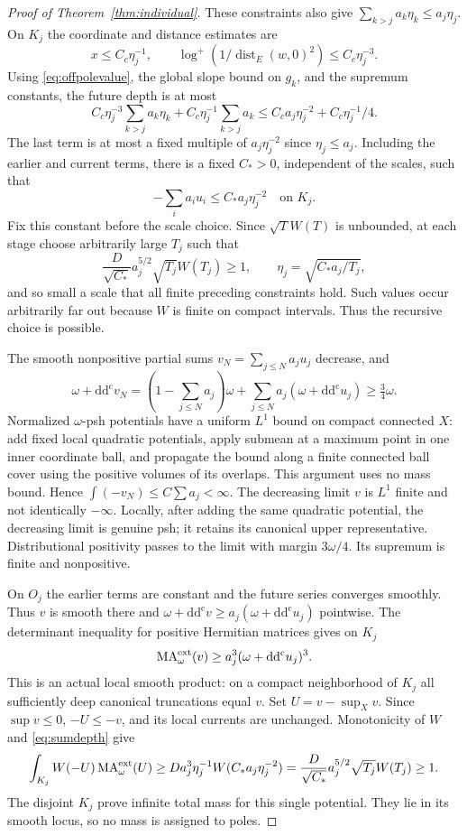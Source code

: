 \documentclass[11pt]{article}
\theoremstyle{remark}
\newcommand{\ddc}{\mathrm{d}\mathrm{d}^{\mathrm c}}
\newcommand{\MA}{\operatorname{MA}}
\begin{document}
\begin{proof}[Proof of Theorem~\ref{thm:individual}]
These constraints also give $\sum_{k>j}a_k\eta_k\leq a_j\eta_j$.
On $K_j$ the coordinate and distance estimates are
\[
 x\leq C_c\eta_j^{-1},\qquad
 \log^+(1/\operatorname{dist}_E(w,0)^2)\leq C_c\eta_j^{-3}.
\]
Using \eqref{eq:offpolevalue}, the global slope bound on $g_k$, and the
supremum constants, the future depth is at most
\[
 C_c\eta_j^{-3}\sum_{k>j}a_k\eta_k
       +C_c\eta_j^{-1}\sum_{k>j}a_k
 \leq C_c a_j\eta_j^{-2}+C_c\eta_j^{-1}/4.
\]
The last term is at most a fixed multiple of $a_j\eta_j^{-2}$ since
$\eta_j\leq a_j$. Including the earlier and current terms, there is a fixed
$C_*>0$, independent of the scales, such that
\begin{equation}\label{eq:sumdepth}
 -\sum_i a_iu_i\leq C_*a_j\eta_j^{-2}\quad\text{on }K_j.
\end{equation}
Fix this constant before the scale choice. Since $\sqrt T W(T)$ is unbounded,
at each stage choose arbitrarily large $T_j$ such that
\[
 \frac D{\sqrt{C_*}}a_j^{5/2}\sqrt{T_j}W(T_j)\geq1,
 \qquad \eta_j=\sqrt{C_*a_j/T_j},
\]
and so small a scale that all finite preceding constraints hold.
Such values occur arbitrarily far out because $W$ is finite on compact
intervals. Thus the recursive choice is possible.

The smooth nonpositive partial sums $v_N=\sum_{j\leq N}a_ju_j$ decrease, and
\[
 \omega+\ddc v_N
 =(1-\sum_{j\leq N}a_j)\omega
       +\sum_{j\leq N}a_j(\omega+\ddc u_j)\geq\tfrac34\omega.
\]
Normalized $\omega$-psh potentials have a uniform $L^1$ bound on compact
connected $X$: add fixed local quadratic potentials, apply submean at a
maximum point in one inner coordinate ball, and propagate the bound along
a finite connected ball cover using the positive volumes of its overlaps.
This argument uses no mass bound. Hence $\int(-v_N)\leq C\sum a_j<\infty$.
The decreasing limit $v$ is $L^1$ finite and not identically $-\infty$.
Locally, after adding the same quadratic potential, the decreasing limit is
genuine psh; it retains its canonical upper representative.
Distributional positivity passes to the limit with margin $3\omega/4$.
Its supremum is finite and nonpositive.

On $O_j$ the earlier terms are constant and the future series converges
smoothly. Thus $v$ is smooth there and
$\omega+\ddc v\geq a_j(\omega+\ddc u_j)$ pointwise.
The determinant inequality for positive Hermitian matrices gives on $K_j$
\[
 \MA^{\rm ext}_\omega(v)\geq a_j^3(\omega+\ddc u_j)^3.
\]
This is an actual local smooth product: on a compact neighborhood of $K_j$
all sufficiently deep canonical truncations equal $v$.
Set $U=v-\sup_Xv$. Since $\sup v\leq0$, $-U\leq-v$, and its local currents
are unchanged. Monotonicity of $W$ and \eqref{eq:sumdepth} give
\[
 \int_{K_j}W(-U)\MA^{\rm ext}_\omega(U)
 \geq D a_j^3\eta_j^{-1}W(C_*a_j\eta_j^{-2})
 =\frac D{\sqrt{C_*}}a_j^{5/2}\sqrt{T_j}W(T_j)\geq1.
\]
The disjoint $K_j$ prove infinite total mass for this single potential.
They lie in its smooth locus, so no mass is assigned to poles.
\end{proof}
\end{document}
